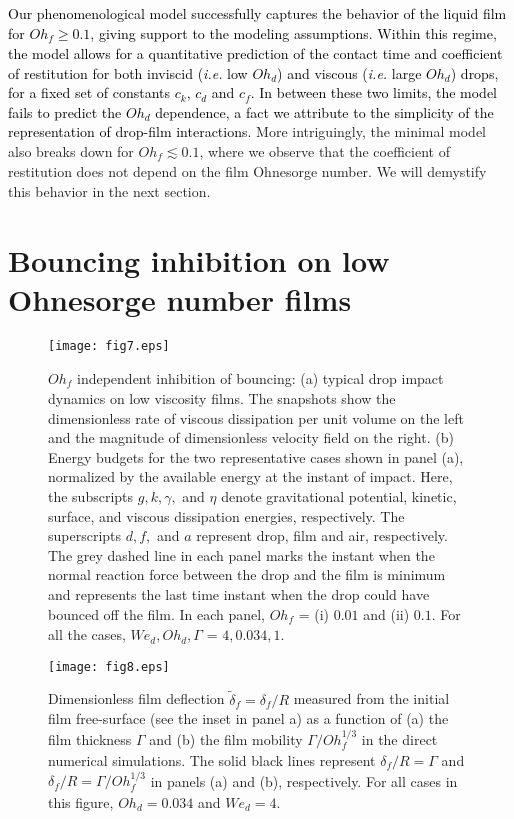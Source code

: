 \documentclass[]{jfm}
\newcommand{\revRev}[1]{\textcolor{black}{#1}}
\newcommand{\Ohd}{\mathit{Oh}_\mathit{d}}
\newcommand{\Ohf}{\mathit{Oh}_\mathit{f}}
\newcommand{\Wen}{\mathit{We}_\mathit{d}}
\begin{document}
\revRev{Our phenomenological model successfully captures the behavior of the liquid film for $\Ohf \ge 0.1$, giving support to the modeling assumptions. Within this regime, the model allows for a quantitative prediction of the contact time and coefficient of restitution for both inviscid (\emph{i.e.} low $\Ohd$) and viscous (\emph{i.e.} large $\Ohd$) drops, for a fixed set of constants $c_k$, $c_d$ and $c_f$. In between these two limits, the model fails to predict the $\Ohd$ dependence, a fact we attribute to the simplicity of the representation of drop-film interactions.}
More intriguingly, the minimal model also breaks down for $\Ohf \lesssim 0.1$, where we observe that the coefficient of restitution does not depend on the film Ohnesorge number. We will demystify this behavior in the next section. 

\section{Bouncing inhibition on low Ohnesorge number films}
\label{sec:EnergySection}

\begin{figure}
	\centering
	\texttt{[image: fig7.eps]}
	\caption{$\Ohf$ independent inhibition of bouncing: (a) typical drop impact dynamics on low viscosity films. The snapshots show the dimensionless rate of viscous dissipation per unit volume 
		on the left and the magnitude of dimensionless velocity field %
		on the right. 
		(b) Energy budgets for the two representative cases shown in panel (a), normalized by the available energy at the instant of impact. Here, the subscripts $g, k, \gamma,$ and $\eta$ denote gravitational potential, kinetic, surface, and viscous dissipation energies, respectively. The superscripts $d, f,$ and $a$ represent drop, film and air, respectively. The grey dashed line in each panel marks the instant when the normal reaction force between the drop and the film is minimum and represents the last time instant when the drop could have bounced off the film. In each panel, $\Ohf$ = (i) $0.01$ and (ii) $0.1$. For all the cases, $\Wen, \Ohd, \Gamma$ = $4, 0.034, 1$. }
	\label{fig:Plateau}
\end{figure}
\begin{figure}
	\centering
	\texttt{[image: fig8.eps]}
	\caption{Dimensionless film deflection $\tilde{\delta}_f = \delta_f/R$ measured from the initial film free-surface (see the inset in panel a) as a function of (a) the film thickness $\Gamma$ and (b) the film mobility $\Gamma / \Ohf^{1/3}$ in the direct numerical simulations. 
		The solid black lines represent $\delta_f/R = \Gamma$ and $\delta_f/R = \Gamma/\Ohf^{1/3}$ in panels (a) and (b), respectively. For all cases in this figure, $\Ohd = 0.034$ and $\Wen = 4$.}
	\label{fig:Deflection}
\end{figure}
\end{document}
